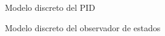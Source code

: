 \documentclass[a4paper, 10pt, onecolumn,journal]{ieeeconf}
\begin{document}
\begin{figure}[H]
	\centering
	\begin{adjustbox}{max width=\columnwidth}
	\end{adjustbox}
	\caption{Modelo discreto del PID}
	\label{Modelo discreto del PID}
\end{figure}
\begin{figure}[H]
	\centering
	\begin{adjustbox}{max width=\columnwidth}
	\end{adjustbox}
	\caption{Modelo discreto del observador de estados}
	\label{Modelo discreto del observador de estados}
\end{figure}
\end{document}
